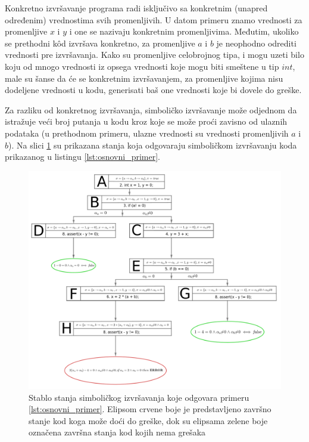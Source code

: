 \documentclass[12pt,oneside]{memoir}
\begin{document}
Konkretno izvršavanje programa radi isključivo sa konkretnim (unapred određenim) vrednostima svih promenljivih. U datom primeru znamo vrednosti za promenljive $x$ i $y$ i one se nazivaju konkretnim promenljivima. Međutim, ukoliko se prethodni k\^od izvršava konkretno, za promenljive $a$ i $b$ je neophodno odrediti vrednosti pre izvršavanja. Kako su promenljive celobrojnog tipa, i mogu uzeti bilo koju od mnogo vrednosti iz opsega vrednosti koje mogu biti smeštene u tip $int$, male su šanse da će se konkretnim izvršavanjem, za promenljive kojima nisu dodeljene vrednosti u kodu, generisati baš one vrednosti koje bi dovele do greške. 

Za razliku od konkretnog izvršavanja, simboličko izvršavanje može odjednom da istražuje veći broj putanja u kodu kroz koje se može proći zavisno od ulaznih podataka (u prethodnom primeru, ulazne vrednosti su vrednosti promenljivih $a$ i $b$). Na slici \ref{fig:osnovni_primer} su prikazana stanja koja odgovaraju simboličkom izvršavanju koda prikazanog u listingu \ref{lst:osnovni_primer}. 


\begin{figure}[ht]
    \centering
    \includegraphics[width=1.0\linewidth]{osnovni_primer.png}
    \caption{Stablo stanja simboličkog izvršavanja koje odgovara primeru \ref{lst:osnovni_primer}. Elipsom crvene boje je predstavljeno završno stanje kod koga može doći do greške, dok su elipsama zelene boje označena završna stanja kod kojih nema grešaka}
    \label{fig:osnovni_primer}
\end{figure}
\end{document}
